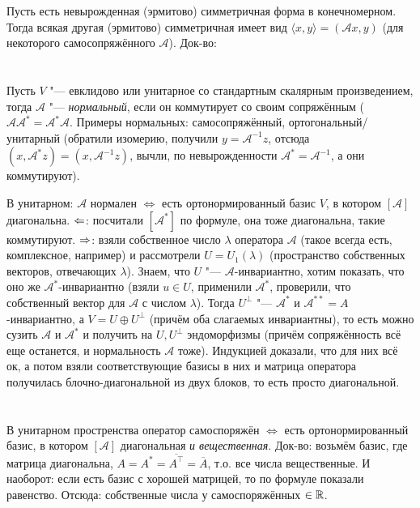 Пусть есть невырожденная (эрмитово) симметричная форма в конечномерном.
Тогда всякая другая (эрмитово) симметричная имеет вид $\langle x, y \rangle = (\mathcal A x, y)$ (для некоторого самосопряжённого $\mathcal A$).
Док-во: \TODO  %

\section{} %
Пусть $V$ "--- евклидово или унитарное со стандартным скалярным произведением, тогда $\mathcal A$ "--- \textit{нормальный}, если он коммутирует
со своим сопряжённым ($\mathcal A \mathcal A^* = \mathcal A^* \mathcal A$.
Примеры нормальных: самосопряжённый, ортогональный/унитарный (обратили изомерию, получили $y=\mathcal A^{-1}z$, отсюда $(x, \mathcal A^*z)=(x,\mathcal A^{-1}z)$,
вычли, по невырожденности $\mathcal A^*=\mathcal A^{-1}$, а они коммутируют).

В унитарном: $\mathcal A$ нормален $\iff$ есть ортонормированный базис $V$, в котором $[\mathcal A]$ диагональна.
$\Leftarrow$: посчитали $[\mathcal A^*]$ по формуле, она тоже диагональна, такие коммутируют.
$\Rightarrow$: взяли собственное число $\lambda$ оператора $\mathcal{A}$ (такое всегда есть, комплексное, например) и рассмотрели $U=U_1(\lambda)$ (пространство собственных векторов, отвечающих $\lambda$).
Знаем, что $U$ "--- $\mathcal A$-инвариантно, хотим показать, что оно же $\mathcal A^*$-инвариантно (взяли $u \in U$, применили $\mathcal A^*$, проверили,
что собственный вектор для $\mathcal A$ с числом $\lambda$).
Тогда $U^\bot$ "--- $\mathcal A^*$ и $\mathcal A^{**}=A$-инвариантно, а $V=U \oplus U^\bot$ (причём оба слагаемых инвариантны),
то есть можно сузить $\mathcal A$ и $\mathcal A^*$ и получить на $U, U^\bot$ эндоморфизмы (причём сопряжённость всё еще останется, и нормальность $\mathcal A$ тоже).
Индукцией доказали, что для них всё ок, а потом взяли соответствующие базисы в них и матрица оператора получилась блочно-диагональной из двух блоков, то есть просто диагональной.

\TODO  %

\section{} %
В унитарном простренства оператор самоспоряжён $\iff$ есть ортонормированный базис, в котором $[ \mathcal A ]$ диагональная \textit{и вещественная}.
Док-во: возьмём базис, где матрица диагональна, $A = A^* = \overline{A^\top} = \overline{A}$, т.о. все числа вещественные.
И наоборот: если есть базис с хорошей матрицей, то по формуле показали равенство.
Отсюда: собственные числа у самоспоряжённых $\in \mathbb{R}$.

